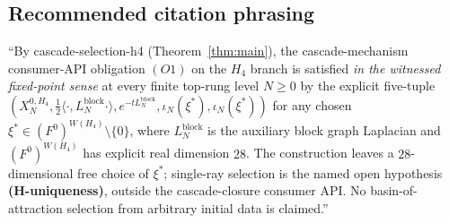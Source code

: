 \documentclass[11pt]{article}
\theoremstyle{definition}
\begin{document}
\subsection{Recommended citation phrasing}

``By cascade-selection-h4 (Theorem~\ref{thm:main}), the
cascade-mechanism consumer-API obligation $(O1)$ on the $H_4$
branch is satisfied \emph{in the witnessed fixed-point sense} at
every finite top-rung level $N \geq 0$ by the explicit five-tuple
$(X_N^{0, H_4}, \tfrac12 \langle \cdot, L_N^{\mathrm{block}}
\cdot \rangle, e^{-t L_N^{\mathrm{block}}}, \iota_N(\xi^{*}),
\iota_N(\xi^{*}))$ for any chosen $\xi^{*} \in (F^0)^{W(H_4)}
\setminus \{0\}$, where $L_N^{\mathrm{block}}$ is the auxiliary
block graph Laplacian and $(F^0)^{W(H_4)}$ has explicit real
dimension $28$. The construction leaves a $28$-dimensional free
choice of $\xi^{*}$; single-ray selection is the named open
hypothesis \textbf{(H-uniqueness)}, outside the cascade-closure
consumer API. No basin-of-attraction selection from arbitrary
initial data is claimed.''
\end{document}
